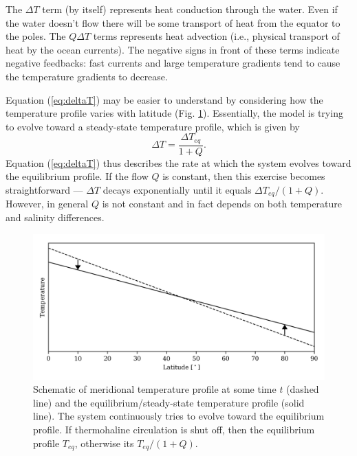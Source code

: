 \documentclass[11pt,letterpaper]{article}
\begin{document}
The $\Delta{T}$ term (by itself) represents heat conduction through the water. Even if the water doesn't flow there will be some transport of heat from the equator to the poles. The $Q\Delta{T}$ terms represents heat advection (i.e., physical transport of heat by the ocean currents). The negative signs in front of these terms indicate negative feedbacks: fast currents and large temperature gradients tend to cause the temperature gradients to decrease.

Equation (\ref{eq:deltaT}) may be easier to understand by considering how the temperature profile varies with latitude (Fig. \ref{fig:T_gradient}). Essentially, the model is trying to evolve toward a steady-state temperature profile, which is given by
\begin{equation}
\Delta{T}=\frac{\Delta T_{eq}}{1+Q}.
\end{equation}
Equation (\ref{eq:deltaT}) thus describes the rate at which the system evolves toward the equilibrium profile. If the flow $Q$ is constant, then this exercise becomes straightforward --- $\Delta T$ decays exponentially until it equals $\Delta T_{eq}/(1+Q)$. However, in general $Q$ is not constant and in fact depends on both temperature and salinity differences.

\begin{figure}[t]
\begin{center}
\includegraphics[]{./T_gradient.jpg}
\end{center}
\caption{Schematic of meridional temperature profile at some time $t$ (dashed line) and the equilibrium/steady-state temperature profile (solid line). The system continuously tries to evolve toward the equilibrium profile. If thermohaline circulation is shut off, then the equilibrium profile $T_{eq}$, otherwise its $T_{eq}/(1+Q)$.}
\label{fig:T_gradient}
\end{figure}
\end{document}
